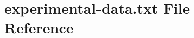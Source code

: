 \hypertarget{experimental-data_8txt}{}\section{experimental-\/data.txt File Reference}
\label{experimental-data_8txt}

